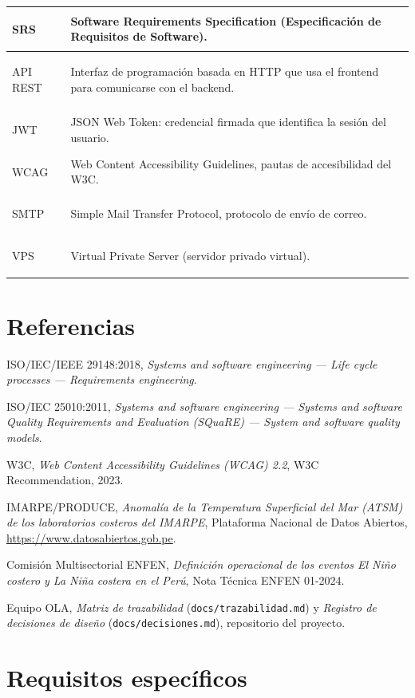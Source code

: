 \documentclass[11pt,a4paper,oneside]{article}
\begin{document}
{\begin{xltabular}{\textwidth}{@{}>{\sffamily\bfseries\raggedright\arraybackslash}p{4.2cm}Y@{}}
SRS & Software Requirements Specification (Especificación de Requisitos de Software).\\ \hline
{}API REST & Interfaz de programación basada en HTTP que usa el frontend para comunicarse con el backend.\\ \hline
JWT & JSON Web Token: credencial firmada que identifica la sesión del usuario.\\ \hline
{}WCAG & Web Content Accessibility Guidelines, pautas de accesibilidad del W3C.\\ \hline
SMTP & Simple Mail Transfer Protocol, protocolo de envío de correo.\\ \hline
{}VPS & Virtual Private Server (servidor privado virtual).\\ \hline
\end{xltabular}}
\vspace{0.6em}

\section{Referencias}

\begin{enumerate}[label={[\arabic*]}, leftmargin=2.2em, itemsep=3pt]
\item ISO/IEC/IEEE 29148:2018, \emph{Systems and software engineering — Life cycle processes — Requirements engineering}.
\item ISO/IEC 25010:2011, \emph{Systems and software engineering — Systems and software Quality Requirements and Evaluation (SQuaRE) — System and software quality models}.
\item W3C, \emph{Web Content Accessibility Guidelines (WCAG) 2.2}, W3C Recommendation, 2023.
\item IMARPE/PRODUCE, \emph{Anomalía de la Temperatura Superficial del Mar (ATSM) de los laboratorios costeros del IMARPE}, Plataforma Nacional de Datos Abiertos, \url{https://www.datosabiertos.gob.pe}.
\item Comisión Multisectorial ENFEN, \emph{Definición operacional de los eventos El Niño costero y La Niña costera en el Perú}, Nota Técnica ENFEN 01-2024.
\item Equipo OLA, \emph{Matriz de trazabilidad} (\texttt{docs/trazabilidad.md}) y \emph{Registro de decisiones de diseño} (\texttt{docs/decisiones.md}), repositorio del proyecto.
\end{enumerate}


\clearpage\section{Requisitos específicos}
\end{document}
